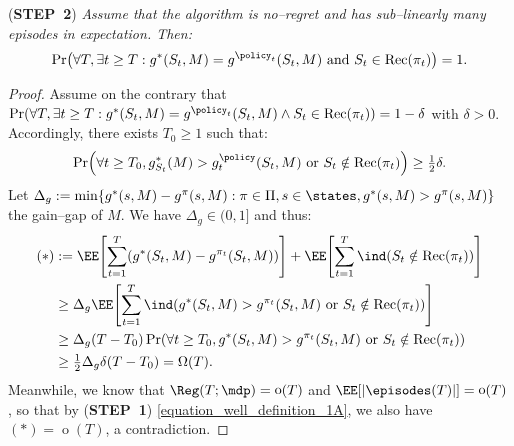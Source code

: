 \documentclass[preprint,cleveref,12pt]{colt2025}
\DeclarePairedDelimiter{\braces}{\{}{\}}	%
\DeclarePairedDelimiter{\brackets}{[}{]}	%
\DeclarePairedDelimiter{\parens}{(}{)}	%
\DeclarePairedDelimiter{\abs}{\lvert}{\rvert}	%
\newcommand{\eqindicator}[1]{\ind\parens*{#1}}
\DeclareMathOperator*{\oh}{\mathrm{o}}
\def\model{\mdp}
\def\STEP#1{(\strong{STEP~#1})}
\newcommand{\strong}[1]{\textbf{#1}}
\begin{document}
    \noindent
    \STEP{2}
    \textit{
        Assume that the algorithm is no--regret and has sub--linearly many episodes in expectation.
        Then:
        \begin{equation}
        \label{equation_well_definition_2A}
            \Pr \parens*{
                \forall T, \exists t \ge T:
                g^*(S_t, M) = g^{\policy_t}(S_t, M)
                \text{~and~}
                S_t \in \mathrm{Rec}(\pi_t)
            }
            =
            1.
        \end{equation}
    }
    \begin{proof}
        Assume on the contrary that $\Pr(\forall T, \exists t \ge T: g^*(S_t, M) = g^{\policy_t}(S_t, M) \wedge S_t \in \mathrm{Rec}(\pi_t)) = 1 - \delta$ with $\delta > 0$.
        Accordingly, there exists $T_0 \ge 1$ such that:
        \begin{equation*}
            \Pr \parens*{
                \forall t \ge T_0,
                g_{S_t}^*(M) > g^\policy_t(S_t, M)
                \text{~or~}
                S_t \notin \mathrm{Rec}(\pi_t)
            }
            \ge \tfrac 12 \delta.
        \end{equation*}
        Let $\Delta_g := \min \braces{g^*(s, M) - g^\pi(s, M): \pi \in \Pi, s \in \states, g^*(s, M) > g^\pi(s, M)}$ the gain--gap of $M$.
        We have $\Delta_g \in (0, 1]$ and thus:
        \begin{align*}
            (*) 
            & := \EE\brackets*{
                \sum_{t=1}^T 
                \parens*{g^*(S_t, M) - g^{\pi_t}(S_t, M)}
            }
            + \EE \brackets*{
                \sum_{t=1}^T \eqindicator{S_t \notin \mathrm{Rec}(\pi_t)}
            }
            \\
            & \ge
            \Delta_g
            \EE \brackets*{
                \sum_{t=1}^T
                \eqindicator{
                    g^*(S_t, M) > g^{\pi_t}(S_t, M)
                    \text{~or~}
                    S_t \notin \mathrm{Rec}(\pi_t)
                }
            }
            \\
            & \ge 
            \Delta_g (T - T_0) \Pr \parens*{
                \forall t \ge T_0,
                g^*(S_t, M) > g^{\pi_t}(S_t , M)
                \text{~or~}
                S_t \notin \mathrm{Rec}(\pi_t)
            }
            \\
            & \ge 
            \tfrac 12 \Delta_g \delta (T - T_0)
            = \Omega(T)
            .
        \end{align*}
        Meanwhile, we know that $\Reg(T; \model) = \oh(T)$ and $\EE[\abs*{\episodes(T)}] = \oh(T)$, so that by \STEP{1} \eqref{equation_well_definition_1A}, we also have $(*) = \oh(T)$, a contradiction. 
    \end{proof}
\end{document}
